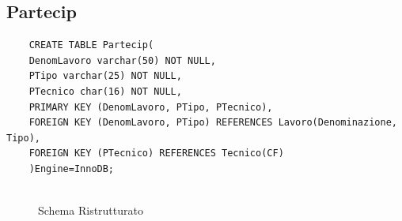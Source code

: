 \documentclass{elegantbook}
\begin{document}
\subsection{Partecip}
\begin{verbatim}
	CREATE TABLE Partecip(
	DenomLavoro varchar(50) NOT NULL,
	PTipo varchar(25) NOT NULL,
	PTecnico char(16) NOT NULL,
	PRIMARY KEY (DenomLavoro, PTipo, PTecnico),
	FOREIGN KEY (DenomLavoro, PTipo) REFERENCES Lavoro(Denominazione, Tipo),
	FOREIGN KEY (PTecnico) REFERENCES Tecnico(CF)
	)Engine=InnoDB;
	
\end{verbatim}
\begin{figure}[H]
	\centering
	\caption{Schema Ristrutturato}
\end{figure}
\end{document}
